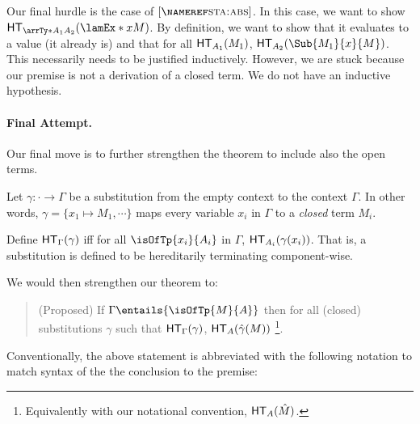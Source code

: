\documentclass[letterpaper]{article}
\begin{document}
Our final hurdle is the case of $\ruleref{sta:abs}$. In this case, we want to show
$\HT[\arrTy*{A_1}{A_2}](\lamEx*{x}{M})$. By definition, we want to show that it evaluates
to a value (it already is) and that for all $\HT[A_1](M_1)$, $\HT[A_2](\Sub{M_1}{x}{M})$.
This necessarily needs to be justified inductively. However, we are stuck because our premise
is not a derivation of a closed term. We do not have an inductive hypothesis.

\paragraph{Final Attempt.} Our final move is to further strengthen the theorem to include also the
open terms.

Let $\gamma : \cdot \to \Gamma$ be a substitution from the empty context to the context $\Gamma$.
In other words, $\gamma = \{x_1 \mapsto M_1, \cdots\}$ maps every variable $x_i$ in $\Gamma$ to a
\emph{closed} term $M_i$.

Define $\HT[\Gamma](\gamma)$ iff for all $\isOfTp{x_i}{A_i}$ in $\Gamma$, $\HT[A_i](\gamma(x_i))$. That
is, a substitution is defined to be hereditarily terminating component-wise.

We would then strengthen our theorem to:

\begin{quotation}
(Proposed) If $\Gamma \entails{\isOfTp{M}{A}}$ then for all (closed) substitutions $\gamma$ such that
$\HT[\Gamma](\gamma)$, $\HT[A](\hat{\gamma}(M))$ \footnote{Equivalently with our notational convention, $\HT[A](\hat{M})$.}.
\end{quotation}

Conventionally, the above statement is abbreviated with the following notation to match syntax of the
the conclusion to the premise:
\end{document}
